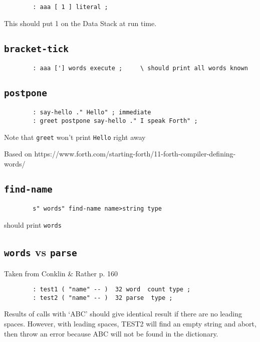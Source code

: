 \begin{lstlisting}
        : aaa [ 1 ] literal ;
\end{lstlisting}

\noindent This should put 1 on the Data Stack at run time.


\subsection{\texttt{bracket-tick}}

\begin{lstlisting}
        : aaa ['] words execute ;     \ should print all words known
\end{lstlisting}


\subsection{\texttt{postpone}}

\begin{lstlisting}
        : say-hello ." Hello" ; immediate
        : greet postpone say-hello ." I speak Forth" ;
\end{lstlisting}

\noindent Note that \texttt{greet} won't print \texttt{Hello} right away

\noindent Based on https://www.forth.com/starting-forth/11-forth-compiler-defining-words/


\subsection{\texttt{find-name}}

\begin{lstlisting}
        s" words" find-name name>string type
\end{lstlisting}

\noindent should print \texttt{words}


\subsection{\texttt{words} vs \texttt{parse}}

Taken from Conklin \& Rather p. 160

\begin{lstlisting}
        : test1 ( "name" -- )  32 word  count type ; 
        : test2 ( "name" -- )  32 parse  type ; 
\end{lstlisting}

\noindent Results of calls with `ABC' should give identical result if there are no
leading spaces. However, with leading spaces, TEST2 will find an empty string
and abort, then throw an error because ABC will not be found in the dictionary.

